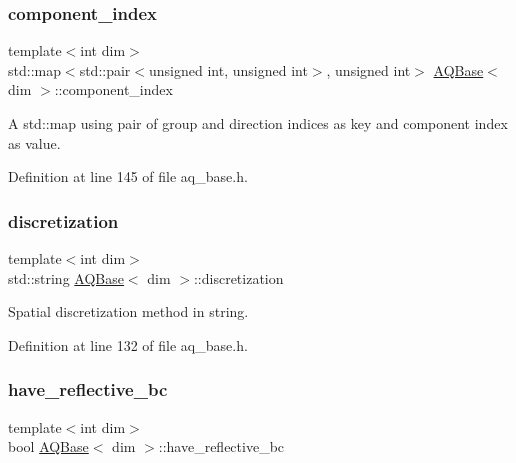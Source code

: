 \subsubsection{\texorpdfstring{component\+\_\+index}{component\_index}}
{\footnotesize\ttfamily template$<$int dim$>$ \\
std\+::map$<$std\+::pair$<$unsigned int, unsigned int$>$, unsigned int$>$ \hyperlink{class_a_q_base}{A\+Q\+Base}$<$ dim $>$\+::component\+\_\+index\hspace{0.3cm}{\ttfamily [protected]}}

A std\+::map using pair of group and direction indices as key and component index as value. 

Definition at line 145 of file aq\+\_\+base.\+h.

\mbox{\label{class_a_q_base_a6c454af11008e235340a7b8e31a02114}} 
\subsubsection{\texorpdfstring{discretization}{discretization}}
{\footnotesize\ttfamily template$<$int dim$>$ \\
std\+::string \hyperlink{class_a_q_base}{A\+Q\+Base}$<$ dim $>$\+::discretization\hspace{0.3cm}{\ttfamily [protected]}}



Spatial discretization method in string. 



Definition at line 132 of file aq\+\_\+base.\+h.

\mbox{\label{class_a_q_base_a8afa1e0da5bbb4846e495178e165b5b5}} 
\subsubsection{\texorpdfstring{have\+\_\+reflective\+\_\+bc}{have\_reflective\_bc}}
{\footnotesize\ttfamily template$<$int dim$>$ \\
bool \hyperlink{class_a_q_base}{A\+Q\+Base}$<$ dim $>$\+::have\+\_\+reflective\+\_\+bc\hspace{0.3cm}{\ttfamily [protected]}}



